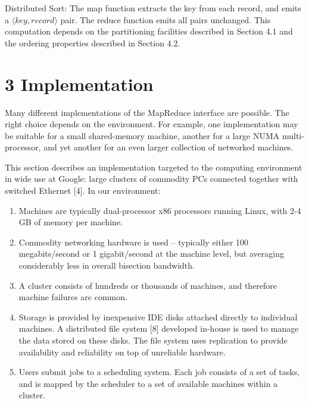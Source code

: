 \documentclass[
]{article}
\providecommand{\tightlist}{%
  \setlength{\itemsep}{0pt}\setlength{\parskip}{0pt}}
\begin{document}
Distributed Sort: The map function extracts the key from each record,
and emits a \(\langle key, record \rangle\) pair. The reduce function
emits all pairs unchanged. This computation depends on the partitioning
facilities described in Section 4.1 and the ordering properties
described in Section 4.2.

\section{3 Implementation}\label{implementation}

Many different implementations of the MapReduce interface are possible.
The right choice depends on the environment. For example, one
implementation may be suitable for a small shared-memory machine,
another for a large NUMA multi-processor, and yet another for an even
larger collection of networked machines.

This section describes an implementation targeted to the computing
environment in wide use at Google: large clusters of commodity PCs
connected together with switched Ethernet {[}4{]}. In our environment:

\begin{enumerate}
\def\labelenumi{(\arabic{enumi})}
\tightlist
\item
  Machines are typically dual-processor x86 processors running Linux,
  with 2-4 GB of memory per machine.\\
\item
  Commodity networking hardware is used -- typically either 100
  megabits/second or 1 gigabit/second at the machine level, but
  averaging considerably less in overall bisection bandwidth.\\
\item
  A cluster consists of hundreds or thousands of machines, and therefore
  machine failures are common.\\
\item
  Storage is provided by inexpensive IDE disks attached directly to
  individual machines. A distributed file system {[}8{]} developed
  in-house is used to manage the data stored on these disks. The file
  system uses replication to provide availability and reliability on top
  of unreliable hardware.\\
\item
  Users submit jobs to a scheduling system. Each job consists of a set
  of tasks, and is mapped by the scheduler to a set of available
  machines within a cluster.
\end{enumerate}
\end{document}
